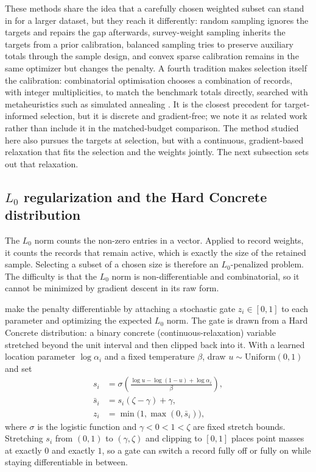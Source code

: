 These methods share the idea that a carefully chosen weighted subset can stand in for a larger
dataset, but they reach it differently: random sampling ignores the targets and repairs the gap
afterwards, survey-weight sampling inherits the targets from a prior calibration, balanced sampling
tries to preserve auxiliary totals through the sample design, and convex sparse calibration remains in
the same optimizer but changes the penalty. A fourth tradition makes selection itself the calibration:
combinatorial optimisation chooses a combination of records, with integer multiplicities, to match the
benchmark totals directly, searched with metaheuristics such as simulated annealing
\citep{kirkpatrick1983, williamson1998, voas2000}. It is the closest precedent for target-informed
selection, but it is discrete and gradient-free; we note it as related work rather than include it in
the matched-budget comparison. The method studied here also pursues the targets at selection, but with
a continuous, gradient-based relaxation that fits the selection and the weights jointly. The next
subsection sets out that relaxation.

\subsection{\texorpdfstring{$L_0$}{L0} regularization and the Hard Concrete distribution}

The $L_0$ norm counts the non-zero entries in a vector. Applied to record weights, it counts the
records that remain active, which is exactly the size of the retained sample. Selecting a subset of
a chosen size is therefore an $L_0$-penalized problem. The difficulty is that the $L_0$ norm is
non-differentiable and combinatorial, so it cannot be minimized by gradient descent in its raw form.

\citet{louizos2018} make the penalty differentiable by attaching a stochastic gate $z_i \in [0, 1]$
to each parameter and optimizing the expected $L_0$ norm. The gate is drawn from a Hard Concrete
distribution: a binary concrete (continuous-relaxation) variable stretched beyond the unit interval
and then clipped back into it. With a learned location parameter $\log \alpha_i$ and a fixed
temperature $\beta$, draw $u \sim \mathrm{Uniform}(0, 1)$ and set
\begin{align}
    s_i      &= \sigma\!\left(\frac{\log u - \log(1 - u) + \log \alpha_i}{\beta}\right), \\
    \bar{s}_i &= s_i (\zeta - \gamma) + \gamma, \\
    z_i      &= \min\!\big(1, \max(0, \bar{s}_i)\big),
    \label{eq:hardconcrete}
\end{align}
where $\sigma$ is the logistic function and $\gamma < 0 < 1 < \zeta$ are fixed stretch bounds.
Stretching $s_i$ from $(0, 1)$ to $(\gamma, \zeta)$ and clipping to $[0, 1]$ places point masses at
exactly $0$ and exactly $1$, so a gate can switch a record fully off or fully on while staying
differentiable in between.

